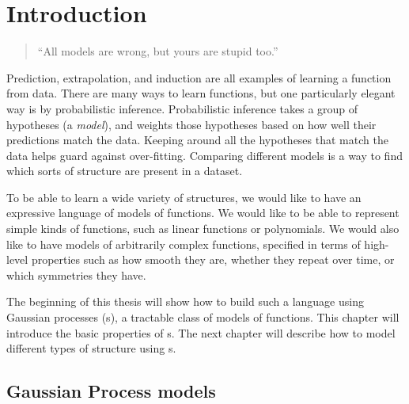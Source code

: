 
\inbpdocument

\chapter{Introduction}
\label{ch:intro}




\begin{quotation}
``All models are wrong, but yours are stupid too.'' \\
\hspace*{\fill} \citet{mlhipster}
\end{quotation}

Prediction, extrapolation, and induction are all examples of learning a function from data.
There are many ways to learn functions, but one particularly elegant way is by probabilistic inference.
Probabilistic inference takes a group of hypotheses (a \emph{model}), and weights those hypotheses based on how well their predictions match the data.
Keeping around all the hypotheses that match the data helps guard against over-fitting.
Comparing different models is a way to find which sorts of structure are present in a dataset.

To be able to learn a wide variety of structures, we would like to have an expressive language of models of functions.
We would like to be able to represent simple kinds of functions, such as linear functions or polynomials.
We would also like to have models of arbitrarily complex functions, specified in terms of high-level properties such as how smooth they are, whether they repeat over time, or which symmetries they have.

The beginning of this thesis will show how to build such a language using Gaussian processes (\gp{}s), a tractable class of models of functions.
This chapter will introduce the basic properties of \gp{}s.
The next chapter will describe how to model different types of structure using \gp{}s.




\section{Gaussian Process models}

